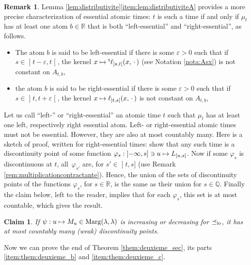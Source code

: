 \documentclass[JEP,XML,SOM,Unicode,NoEqCountersInSection,NoFloatCountersInSection,published]{cedram}
\newcommand\mto{\mathchoice{\longmapsto}{\mapsto}{\mapsto}{\mapsto}}
\theoremstyle{plain}
\newtheorem*{claim}{Claim}
\theoremstyle{definition}
\newtheorem{rem}[them]{Remark}
\newcommand{\trans}{{}^{\mathrm{t}}\mkern-1mu}
\newcommand{\espcdot}{\mbox{$\,\cdot\,$}}
\let\eps\varepsilon
\newcommand{\la}{\lambda}
\newcommand{\ma}{\mathrm{Marg}}
\newcommand{\R}{\mathbb{R}}
\newcommand{\Q}{\mathbb{Q}}
\newcommand{\op}{\mathopen}
\newcommand{\clo}{\mathclose}
\newcommand{\leqlc}{\preceq_{\rm lo}}
\begin{document}
\begin{rem}\label{rem:essentiel_divers_bis}Lemma \ref{lem:distributivite}\eqref{item:lem:distributiviteA} provides a more precise characterization of essential atomic times: $t$ is such a time if and only if $\mu_t$ has at least one atom $b\in\R$ that is both ``left-essential'' and ``right-essential'', as follows.
\begin{itemize}
\item
The atom $b$ is said to be left-essential if there is some $\eps\!>\!0$ such that if $s\!\in\!\op]t-\eps,t\clo[$, the kernel $x\mto \trans\ell_{\op]s,t\clo[}(x,\espcdot)$ (see Notation \ref{nota:Asx}) is not constant on $A_{t,b}$,

\item
the atom $b$ is said to be right-essential if there is some $\eps\!>\!0$ such that if $s\!\in\!\op]t,t+\eps\clo[$, the kernel $x\mto\ell_{\op]t,s\clo[}(x,\espcdot)$ is not constant on $A_{t,b}$,
\end{itemize}
Let us call ``left-'' or ``right-essential'' an atomic time $t$ such that $\mu_t$ has at least one left, respectively right essential atom. Left- or right-essential atomic times must not be essential. However, they are also at most countably many. Here is a sketch of proof, written for right-essential times: show that any such time is a discontinuity point of some function $\varphi_s:\op]-\infty,s]\ni u\mto L_{[u,s]}$. Now if some $\varphi_s$ is discontinuous at $t$, all~$\varphi_{s'}$ are, for $s'\in\op]t,s]$ (use Remark \ref{rem:multiplicationcontractante}). Hence, the union of the sets of discontinuity points of the functions $\varphi_s$, for $s\in\R$, is the same as their union for $s\in\Q$. Finally the claim below, left to the reader, implies that for each $\varphi_s$, this set is at most countable, which gives the result.

\begin{claim}
If $\psi:u\mto M_u\in \ma(\la,\la)$ is increasing or decreasing for $\leqlc$, it has at most countably many (weak) discontinuity points.
\end{claim}
\end{rem}

Now we can prove the end of Theorem \ref{them:deuxieme_sec}, \ie its parts \eqref{item:them:deuxieme_b} and \eqref{item:them:deuxieme_c}.
\end{document}
